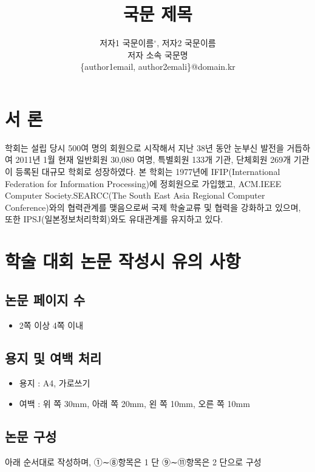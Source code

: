 \documentclass{kcc}
\title{국문 제목}
\author{
저자1 국문이름$^{\circ}$, 저자2 국문이름\\
저자 소속 국문명 \\
\{author1email, author2emali\}@domain.kr
}
\begin{document}
\maketitle


\section{서 론}
학회는 설립 당시 500여 명의 회원으로 시작해서 지난 38년 동안 눈부신 발전을 거듭하여 
2011년 1월 현재 일반회원 30,080 여명, 특별회원 133개 기관, 단체회원 269개 기관이 등록된 대규모 학회로 성장하였다. 
본 학회는 1977년에 IFIP(International Federation for Information Processing)에 정회원으로 가입했고, 
ACM.IEEE Computer Society.SEARCC(The South East Asia Regional Computer Conference)와의 협력관계를 맺음으로써 
국제 학술교류 및 협력을 강화하고 있으며, 또한 IPSJ(일본정보처리학회)와도 유대관계를 유지하고 있다.


\section{학술 대회 논문 작성시 유의 사항}

\subsection{논문 페이지 수}
\begin{itemize}[itemsep=0pt,parsep=0pt]
  \item 2쪽 이상 4쪽 이내 
\end{itemize}


\subsection{용지 및 여백 처리}
\begin{itemize}[itemsep=0pt,parsep=0pt]
  \item 용지 : A4, 가로쓰기
  \item 여백 : 위 쪽 30mm, 아래 쪽 20mm, 왼 쪽 10mm, 오른 쪽 10mm
\end{itemize}

\subsection{논문 구성}
아래 순서대로 작성하며, ①∼⑧항목은 1 단 ⑨∼⑪항목은 2 단으로 구성
\end{document}
